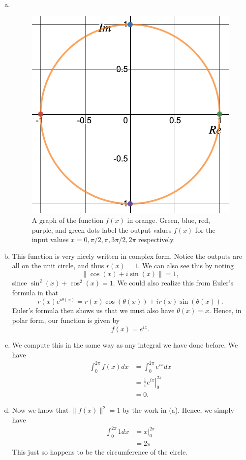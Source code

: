 \documentclass[12pt]{article} %
\begin{document}
\begin{solution}~
	\begin{enumerate}[(a)]
		\item ~
		\begin{figure}[H]
			\centering
			\includegraphics[width=.5\textwidth]{figures/circle_parameterization.png}
			\caption{A graph of the function $f(x)$ in orange. Green, blue, red, purple, and green dots label the output values $f(x)$ for the input values $x=0,\pi/2,\pi,3\pi/2,2\pi$ respectively.}
		\end{figure}
		\item This function is very nicely written in complex form.  Notice the outputs are all on the unit circle, and thus $r(x)=1$.  We can also see this by noting 
		\[
		\|\cos(x)+i\sin(x)\|=1,
		\]
		since $\sin^2(x)+\cos^2(x)=1$.  We could also realize this from Euler's formula in that
		\[
		r(x)e^{i\theta(x)}=r(x)\cos(\theta(x))+ir(x)\sin(\theta(x)).
		\]
		Euler's formula then shows us that we must also have $\theta(x)=x$. Hence, in polar form, our function is given by
		\[
		f(x)=e^{ix}.
		\]
		\item We compute this in the same way as any integral we have done before. We have
		\begin{align*}
			\int_0^{2\pi} f(x) dx &= \int_0^{2\pi} e^{ix}dx\\
			&= \left. \frac{1}{i} e^{ix} \right\vert_0^{2\pi}\\
			&= 0.
		\end{align*}
		\item Now we know that $\|f(x)\|^2=1$ by the work in (a). Hence, we simply have
		\begin{align*}
			\int_0^{2\pi} 1 dx &= x\vert_0^{2\pi}\\
			&= 2\pi
		\end{align*}
		This just so happens to be the circumference of the circle.  
	\end{enumerate}
\end{solution}
\end{document}
